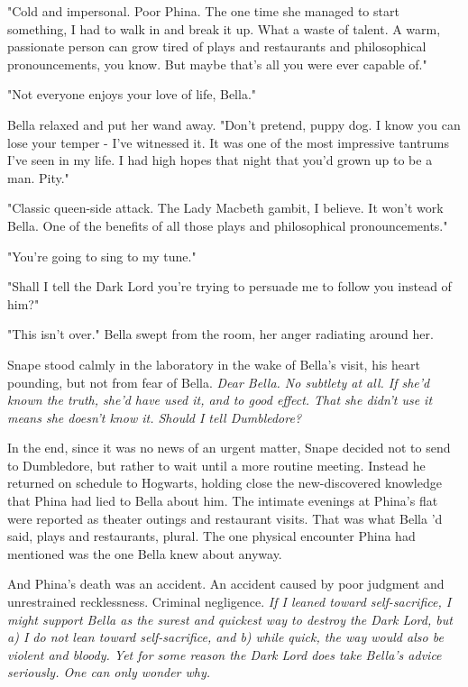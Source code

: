 \documentclass[a4paper,11pt]{article}
\begin{document}
"Cold and impersonal. Poor Phina. The one time she managed to start something, I had to walk in and break it up. What a waste of talent. A warm, passionate person can grow tired of plays and restaurants and philosophical pronouncements, you know. But maybe that's all you were ever capable of."

"Not everyone enjoys your love of life, Bella."

Bella relaxed and put her wand away. "Don't pretend, puppy dog. I know you can lose your temper - I've witnessed it. It was one of the most impressive tantrums I've seen in my life. I had high hopes that night that you'd grown up to be a man. Pity."

"Classic queen-side attack. The Lady Macbeth gambit, I believe. It won't work Bella. One of the benefits of all those plays and philosophical pronouncements."

"You're going to sing to my tune."

"Shall I tell the Dark Lord you're trying to persuade me to follow you instead of him?"

"This isn't over." Bella swept from the room, her anger radiating around her.

Snape stood calmly in the laboratory in the wake of Bella's visit, his heart pounding, but not from fear of Bella. \emph{Dear Bella. No subtlety at all. If she'd known the truth, she'd have used it, and to good effect. That she didn't use it means she doesn't know it. Should I tell Dumbledore?}

In the end, since it was no news of an urgent matter, Snape decided not to send to Dumbledore, but rather to wait until a more routine meeting. Instead he returned on schedule to Hogwarts, holding close the new-discovered knowledge that Phina had lied to Bella about him. The intimate evenings at Phina's flat were reported as theater outings and restaurant visits. That was what Bella 'd said, plays and restaurants, plural. The one physical encounter Phina had mentioned was the one Bella knew about anyway.

And Phina's death was an accident. An accident caused by poor judgment and unrestrained recklessness. Criminal negligence. \emph{If I leaned toward self-sacrifice, I might support Bella as the surest and quickest way to destroy the Dark Lord, but a) I do not lean toward self-sacrifice, and b) while quick, the way would also be violent and bloody. Yet for some reason the Dark Lord does take Bella's advice seriously. One can only wonder why.}
\end{document}
